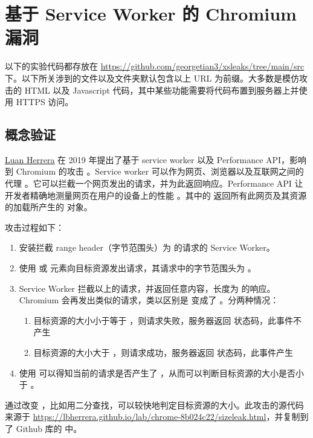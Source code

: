 \section{基于 Service Worker 的 Chromium 漏洞}

以下的实验代码都存放在 \url{https://github.com/georgetian3/xsleaks/tree/main/src} 下。以下所关涉到的文件以及文件夹默认包含以上 URL 为前缀。大多数是模仿攻击的 HTML 以及 Javascript 代码，其中某些功能需要将代码布置到服务器上并使用 HTTPS 访问。

\subsection{概念验证}

\href{https://blog.lbherrera.me/}{Luan Herrera} 在 2019 年提出了基于 service worker 以及 Performance API，影响到 Chromium 的攻击 \cite{herrera}。Service worker 可以作为网页、浏览器以及互联网之间的代理 \cite{sw} 。它可以拦截一个网页发出的请求，并为此返回响应。Performance API 让开发者精确地测量网页在用户的设备上的性能 \cite{papi}。其中的  返回所有此网页及其资源的加载所产生的  对象。

攻击过程如下：

\begin{enumerate}
    \item 安装拦截 range header（字节范围头）为  的请求的 Service Worker。
    \item 使用  或  元素向目标资源发出请求，其请求中的字节范围头为 。
    \item Service Worker 拦截以上的请求，并返回任意内容，长度为  的响应。Chromium 会再发出类似的请求，类以区别是  变成了 。分两种情况：
    \begin{enumerate}
        \item 目标资源的大小小于等于 ，则请求失败，服务器返回  状态码，此事件不产生 
        \item 目标资源的大小大于 ，则请求成功，服务器返回  状态码，此事件产生 
    \end{enumerate}
    \item 使用  可以得知当前的请求是否产生了 ，从而可以判断目标资源的大小是否小于 。
\end{enumerate}

通过改变 ，比如用二分查找，可以较快地判定目标资源的大小。此攻击的源代码来源于 \url{https://lbherrera.github.io/lab/chrome-8b024c22/sizeleak.html}，并复制到了 Github 库的  中。

